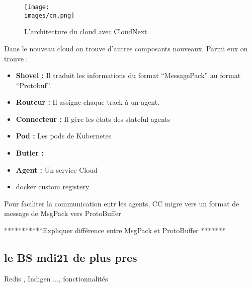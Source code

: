         \begin{figure}[h!]
            \centering
            \texttt{[image: \\images/cn.png]}
            \caption{L'architecture du cloud avec CloudNext}
            \label{fig:cn}
        \end{figure}

        \vspace{0.2cm}

        Dans le nouveau cloud on trouve d'autres composants nouveaux. 
        Parmi eux on trouve : \\[0.3cm]
        \begin{itemize}
            \renewcommand{\labelitemi}{$\bullet$}
                \item \textbf{Shovel :} Il traduit les informations du format “MessagePack” au format “Protobuf”.\\
                \item \textbf{Routeur :} Il assigne chaque track à un agent.\\
                \item \textbf{Connecteur :} Il gère les états des stateful agents\\ 
                \item \textbf{Pod :} Les pods de Kubernetes\\
                \item \textbf{Butler :} \\
                \item \textbf{Agent :} Un service Cloud \\
                \item docker custom registery
            \end{itemize} 

            Pour faciliter la communication entr les agents, \gls{CC} migre vers un format de message de MsgPack  vers ProtoBuffer 

            \vspace{0.2cm}

            ***********Expliquer différence entre MsgPack et ProtoBuffer *******

    \subsection{le BS \gls{mdi21} de plus pres}

        Redis , Indigen ..., fonctionnalités \\
       

